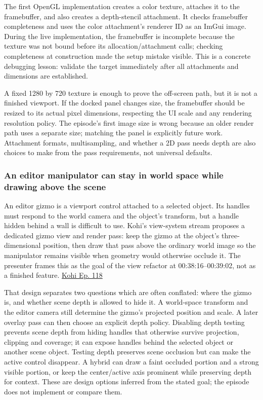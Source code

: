 The first OpenGL implementation creates a color texture, attaches it to the framebuffer, and also creates a depth-stencil attachment. It checks framebuffer completeness and uses the color attachment's renderer ID as an ImGui image. During the live implementation, the framebuffer is incomplete because the texture was not bound before its allocation/attachment calls; checking completeness at construction made the setup mistake visible. This is a concrete debugging lesson: validate the target immediately after all attachments and dimensions are established.

A fixed 1280 by 720 texture is enough to prove the off-screen path, but it is not a finished viewport. If the docked panel changes size, the framebuffer should be resized to its actual pixel dimensions, respecting the UI scale and any rendering resolution policy. The episode's first image size is wrong because an older render path uses a separate size; matching the panel is explicitly future work. Attachment formats, multisampling, and whether a 2D pass needs depth are also choices to make from the pass requirements, not universal defaults.

\subsubsection{An editor manipulator can stay in world space while drawing above the scene}\label{06-engine-ii-ch032-an-editor-manipulator-can-stay-in-world-space-while-drawing-above-the-scene}

An editor gizmo is a viewport control attached to a selected object. Its handles must respond to the world camera and the object's transform, but a handle hidden behind a wall is difficult to use. Kohi's view-system stream proposes a dedicated gizmo view and render pass: keep the gizmo at the object's three-dimensional position, then draw that pass above the ordinary world image so the manipulator remains visible when geometry would otherwise occlude it. The presenter frames this as the goal of the view refactor at 00:38:16--00:39:02, not as a finished feature. \href{https://www.youtube.com/watch?v=CjJqa3iILAQ&t=2296s}{Kohi Ep. 118}

That design separates two questions which are often conflated: where the gizmo is, and whether scene depth is allowed to hide it. A world-space transform and the editor camera still determine the gizmo's projected position and scale. A later overlay pass can then choose an explicit depth policy. Disabling depth testing prevents scene depth from hiding handles that otherwise survive projection, clipping and coverage; it can expose handles behind the selected object or another scene object. Testing depth preserves scene occlusion but can make the active control disappear. A hybrid can draw a faint occluded portion and a strong visible portion, or keep the center/active axis prominent while preserving depth for context. These are design options inferred from the stated goal; the episode does not implement or compare them.

